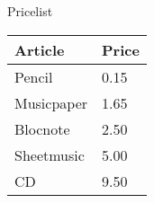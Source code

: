 \documentclass[a4paper]{article}
\begin{document}
\Large{Pricelist}

\vspace{8mm}

\begin{tabular}{ll}\\ \hline
{\bfseries Article} &
{\bfseries Price} \\ \hline\hline
Pencil &0.15 \\Musicpaper &1.65 \\Blocnote &2.50 \\Sheetmusic &5.00 \\CD &9.50\\\hline
\end{tabular}
\end{document}
